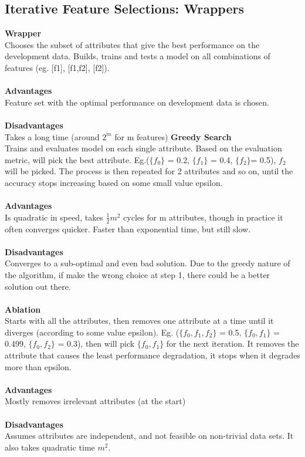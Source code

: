 \documentclass[a4paper,10pt]{article}
\begin{document}
\subsection*{Iterative Feature Selections: Wrappers}
\textcolor{Periwinkle}{\textbf{Wrapper}} \\
Chooses the subset of attributes that give the best performance on the development data. Builds, trains and tests a model on all combinations of features (eg. [f1], [f1,f2], [f2]).\\\\
\textbf{Advantages}\\
Feature set with the optimal performance on development data is chosen. \\\\
\textbf{Disadvantages}\\
Takes a long time (around $2^{m}$ for m features)
\textcolor{Periwinkle}{\textbf{Greedy Search}}\\
Trains and evaluates model on each single attribute. Based on the evaluation metric, will pick the best attribute. Eg.($\{f_{0}\}$ = 0.2, $\{f_{1}\}$ = 0.4, $\{f_{2}\}$= 0.5), $f_{2}$ will be picked. The process is then repeated for 2 attributes and so on, until the accuracy stops increasing based on some small value epsilon. \\\\
\textbf{Advantages}\\ 
Is quadratic in speed, takes $\frac{1}{2}m^{2}$ cycles for m attributes, though in practice it often converges quicker. Faster than exponential time, but still slow. \\\\
\textbf{Disadvantages} \\
Converges to a sub-optimal and even bad solution. Due to the greedy nature of the algorithm, if make the wrong choice at step 1, there could be a better solution out there. \\\\
\newpage
\noindent \textcolor{Periwinkle}{\textbf{Ablation}}\\
Starts with all the attributes, then removes one attribute at a time until it diverges (according to some value epsilon). Eg. ($\{f_{0}, f_{1}, f_{2}\}$ = 0.5, $\{f_{0}, f_{1}\}$ = 0.499, $\{f_{0}, f_{2}\}$ = 0.3), then will pick $\{f_{0}, f_{1}\}$ for the next iteration. It removes the attribute that causes the least performance degradation, it stops when it degrades more than epsilon. \\\\
\textbf{Advantages} \\
Mostly removes irrelevant attributes (at the start) \\\\
\textbf{Disadvantages} \\ 
Assumes attributes are independent, and not feasible on non-trivial data sets. It also takes quadratic time $m^2$. 
\end{document}
